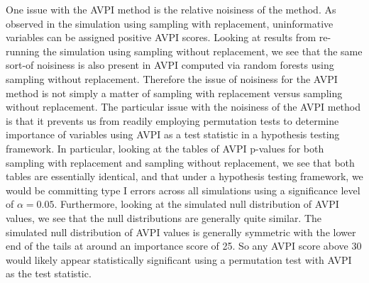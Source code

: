 \documentclass[12pt,twoside]{reedthesis}
\theoremstyle{definition}
\theoremstyle{definition}
\theoremstyle{definition}
\theoremstyle{remark}
\begin{document}
One issue with the AVPI method is the relative noisiness of the method.
As observed in the simulation using sampling with replacement,
uninformative variables can be assigned positive AVPI scores. Looking at
results from re-running the simulation using sampling without
replacement, we see that the same sort-of noisiness is also present in
AVPI computed via random forests using sampling without replacement.
Therefore the issue of noisiness for the AVPI method is not simply a
matter of sampling with replacement versus sampling without replacement.
The particular issue with the noisiness of the AVPI method is that it
prevents us from readily employing permutation tests to determine
importance of variables using AVPI as a test statistic in a hypothesis
testing framework. In particular, looking at the tables of AVPI p-values
for both sampling with replacement and sampling without replacement, we
see that both tables are essentially identical, and that under a
hypothesis testing framework, we would be committing type I errors
across all simulations using a significance level of \(\alpha = 0.05\).
Furthermore, looking at the simulated null distribution of AVPI values,
we see that the null distributions are generally quite similar. The
simulated null distribution of AVPI values is generally symmetric with
the lower end of the tails at around an importance score of 25. So any
AVPI score above 30 would likely appear statistically significant using
a permutation test with AVPI as the test statistic. \par
\end{document}
